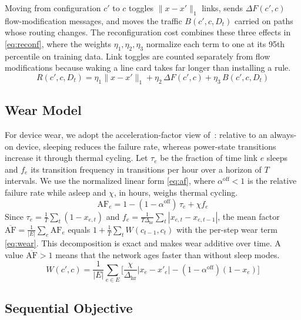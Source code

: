 \documentclass[journal]{IEEEtran}
\begin{document}
Moving from configuration $c'$ to $c$ toggles $\|x-x'\|_1$ links, sends $\Delta F(c',c)$ flow-modification messages, and moves the traffic $B(c',c,D_t)$ carried on paths whose routing changes. The reconfiguration cost combines these three effects in \eqref{eq:reconf}, where the weights $\eta_1,\eta_2,\eta_3$ normalize each term to one at its 95th percentile on training data. Link toggles are counted separately from flow modifications because waking a line card takes far longer than installing a rule.
\begin{equation}\label{eq:reconf}
R(c',c,D_t)=\eta_1\|x-x'\|_1+\eta_2\,\Delta F(c',c)+\eta_3\,B(c',c,D_t)
\end{equation}

\subsection{Wear Model}

For device wear, we adopt the acceleration-factor view of~\cite{chiaraviglio2015lifetime}: relative to an always-on device, sleeping reduces the failure rate, whereas power-state transitions increase it through thermal cycling. Let $\tau_e$ be the fraction of time link $e$ sleeps and $f_e$ its transition frequency in transitions per hour over a horizon of $T$ intervals. We use the normalized linear form \eqref{eq:af}, where $\alpha^{\mathrm{off}}<1$ is the relative failure rate while asleep and $\chi$, in hours, weighs thermal cycling.
\begin{equation}\label{eq:af}
\mathrm{AF}_e=1-(1-\alpha^{\mathrm{off}})\,\tau_e+\chi f_e
\end{equation}
Since $\tau_e=\frac{1}{T}\sum_t(1-x_{e,t})$ and $f_e=\frac{1}{T\Delta_{\mathrm{hr}}}\sum_t|x_{e,t}-x_{e,t-1}|$, the mean factor $\overline{\mathrm{AF}}=\frac{1}{|E|}\sum_e\mathrm{AF}_e$ equals $1+\frac{1}{T}\sum_t W(c_{t-1},c_t)$ with the per-step wear term \eqref{eq:wear}. This decomposition is exact and makes wear additive over time. A value $\overline{\mathrm{AF}}>1$ means that the network ages faster than without sleep modes.
\begin{equation}\label{eq:wear}
W(c',c)=\frac{1}{|E|}\sum_{e\in E}\Big[\frac{\chi}{\Delta_{\mathrm{hr}}}|x_e-x'_e|-(1-\alpha^{\mathrm{off}})(1-x_e)\Big]
\end{equation}

\subsection{Sequential Objective}
\end{document}
